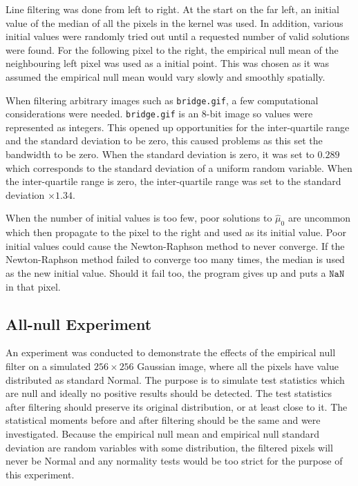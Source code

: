 Line filtering was done from left to right. At the start on the far left, an initial value of the median of all the pixels in the kernel was used. In addition, various initial values were randomly tried out until a requested number of valid solutions were found. For the following pixel to the right, the empirical null mean of the neighbouring left pixel was used as a initial point. This was chosen as it was assumed the empirical null mean would vary slowly and smoothly spatially.

When filtering arbitrary images such as \texttt{bridge.gif}, a few computational considerations were needed. \texttt{bridge.gif} is an 8-bit image so values were represented as integers. This opened up opportunities for the inter-quartile range and the standard deviation to be zero, this caused problems as this set the bandwidth to be zero. When the standard deviation is zero, it was set to $0.289$ which corresponds to the standard deviation of a uniform random variable. When the inter-quartile range is zero, the inter-quartile range was set to the standard deviation $\times 1.34$.

When the number of initial values is too few, poor solutions to $\widehat{\mu}_0$ are uncommon which then propagate to the pixel to the right and used as its initial value. Poor initial values could cause the Newton-Raphson method to never converge. If the Newton-Raphson method failed to converge too many times, the median is used as the new initial value. Should it fail too, the program gives up and puts a $\texttt{NaN}$ in that pixel.

\subsection{All-null Experiment}

An experiment was conducted to demonstrate the effects of the empirical null filter on a simulated $256\times 256$ Gaussian image, where all the pixels have value distributed as standard Normal. The purpose is to simulate test statistics which are null and ideally no positive results should be detected. The test statistics after filtering should preserve its original distribution, or at least close to it. The statistical moments before and after filtering should be the same and were investigated. Because the empirical null mean and empirical null standard deviation are random variables with some distribution, the filtered pixels will never be Normal and any normality tests would be too strict for the purpose of this experiment.

